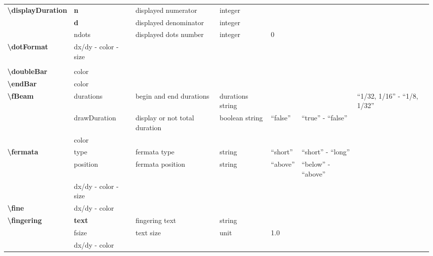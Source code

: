 \documentclass[a4paper, landscape, 10pt]{article}
\begin{document}
\begin{tabularx}{\linewidth}{p{3cm}p{3cm}p{5cm}p{3cm}p{2.5cm}p{3.5cm}p{4cm}}
    \textbf{\textbackslash{}displayDuration}&\textbf{n}&displayed numerator&integer&&&\\
    &\textbf{d}&displayed denominator&integer&&&\\
    &ndots&displayed dots number&integer&0&&\\
    \hline 
    \textbf{\textbackslash{}dotFormat}&dx/dy - color - size&&&&&\\
    &&&&&&\\
    \hline
    \textbf{\textbackslash{}doubleBar}&color&&&&&\\
    \hline
    \textbf{\textbackslash{}endBar}&color&&&&&\\
    \hline
    \textbf{\textbackslash{}fBeam}&durations&begin and end durations&durations string&&&``1/32, 1/16'' - ``1/8, 1/32''\\
    &drawDuration&display or not total duration&boolean string&``false''&``true'' - ``false''&\\
    &color&&&&&\\
    \hline
    \textbf{\textbackslash{}fermata}&type&fermata type&string&``short''&``short'' - ``long''&\\
    &position&fermata position&string&``above''&``below'' - ``above''&\\
    &dx/dy - color - size&&&&&\\
    \hline
    \textbf{\textbackslash{}fine}&dx/dy - color&&&&&\\
    \hline
    \textbf{\textbackslash{}fingering}&\textbf{text}&fingering text&string&&&\\
    &fsize&text size&unit&1.0&&\\
    &dx/dy - color&&&&&\\
    \hline
\end{tabularx}
\end{document}
